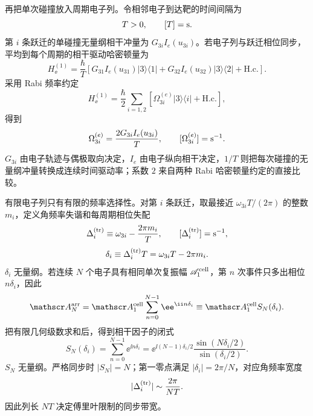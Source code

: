 再把单次碰撞放入周期电子列。令相邻电子到达靶的时间间隔为
\begin{equation*}
T>0,
\qquad [T]={\rm s}.
\end{equation*}
第 $i$ 条跃迁的单碰撞无量纲相干冲量为 $G_{3i}I_e(u_{3i})$。若电子列与跃迁相位同步，平均到每个周期的相干驱动哈密顿量为
\begin{equation}
{
H_\ee^{(1)}
=\frac{\hbar}{T}
\left[
G_{31}I_e(u_{31})|3\rangle\langle1|
+G_{32}I_e(u_{32})|3\rangle\langle2|
+\mathrm{H.c.}
\right].}
\label{eq:electron_train_average_hamiltonian_dp68}
\end{equation}
采用 Rabi 频率约定
\begin{equation*}
H_\ee^{(1)}
=\frac{\hbar}{2}
\sum_{i=1,2}
[\Omega_{3i}^{(e)}|3\rangle\langle i|+\mathrm{H.c.}],
\end{equation*}
得到
\begin{equation}
{
\Omega_{3i}^{(e)}
=\frac{2G_{3i}I_e(u_{3i})}{T},
\qquad
[\Omega_{3i}^{(e)}]={\rm s^{-1}}.}
\label{eq:wu2026_effective_electron_rabi_frequency}
\end{equation}
$G_{3i}$ 由电子轨迹与偶极取向决定，$I_e$ 由电子纵向相干决定，$1/T$ 则把每次碰撞的无量纲冲量转换成连续时间驱动率；系数 $2$ 来自两种 Rabi 哈密顿量约定的直接比较。

有限电子列只有有限的频率选择性。对第 $i$ 条跃迁，取最接近 $\omega_{3i}T/(2\pi)$ 的整数 $m_i$，定义角频率失谐和每周期相位失配
\begin{equation*}
\Delta_i^{({\rm tr})}
\equiv\omega_{3i}-\frac{2\pi m_i}{T},
\qquad
[\Delta_i^{({\rm tr})}]={\rm s^{-1}},
\end{equation*}
\begin{equation*}
\delta_i\equiv\Delta_i^{({\rm tr})}T
=\omega_{3i}T-2\pi m_i.
\end{equation*}
$\delta_i$ 无量纲。若连续 $N$ 个电子具有相同单次复振幅 $\mathscr A_1^{\rm cell}$，第 $n$ 次事件只多出相位 $n\delta_i$，因此
\begin{equation}
{
\mathscr A_N^{\rm arr}
=\mathscr A_1^{\rm cell}\sum_{n=0}^{N-1}\ee^{\ii n\delta_i}
\equiv\mathscr A_1^{\rm cell} S_N(\delta_i).}
\label{eq:electron_train_phase_sum_dp68}
\end{equation}
把有限几何级数求和后，得到相干因子的闭式
\begin{equation}
{
S_N(\delta_i)
=\sum_{n=0}^{N-1}\ee^{\ii n\delta_i}
=\ee^{\ii(N-1)\delta_i/2}
\frac{\sin(N\delta_i/2)}{\sin(\delta_i/2)}.}
\label{eq:electron-train-coherence-factor-dp32}
\end{equation}
$S_N$ 无量纲。严格同步时 $|S_N|=N$；第一零点满足 $|\delta_i|=2\pi/N$，对应角频率宽度
\begin{equation*}
|\Delta_i^{({\rm tr})}|
\sim\frac{2\pi}{NT}.
\end{equation*}
因此列长 $NT$ 决定傅里叶限制的同步带宽。

